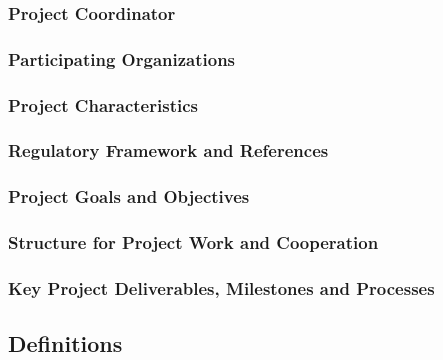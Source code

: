 \documentclass[
  11pt,
]{article}
\begin{document}
\hypertarget{project-coordinator}{%
\subsubsection{Project Coordinator}\label{project-coordinator}}

\hypertarget{participating-organizations}{%
\subsubsection{Participating
Organizations}\label{participating-organizations}}

\hypertarget{project-characteristics}{%
\subsubsection{Project Characteristics}\label{project-characteristics}}

\hypertarget{regulatory-framework-and-references}{%
\subsubsection{Regulatory Framework and
References}\label{regulatory-framework-and-references}}

\hypertarget{project-goals-and-objectives}{%
\subsubsection{Project Goals and
Objectives}\label{project-goals-and-objectives}}

\hypertarget{structure-for-project-work-and-cooperation}{%
\subsubsection{Structure for Project Work and
Cooperation}\label{structure-for-project-work-and-cooperation}}

\hypertarget{key-project-deliverables-milestones-and-processes}{%
\subsubsection{Key Project Deliverables, Milestones and
Processes}\label{key-project-deliverables-milestones-and-processes}}

\hypertarget{definitions}{%
\subsection{Definitions}\label{definitions}}
\end{document}
